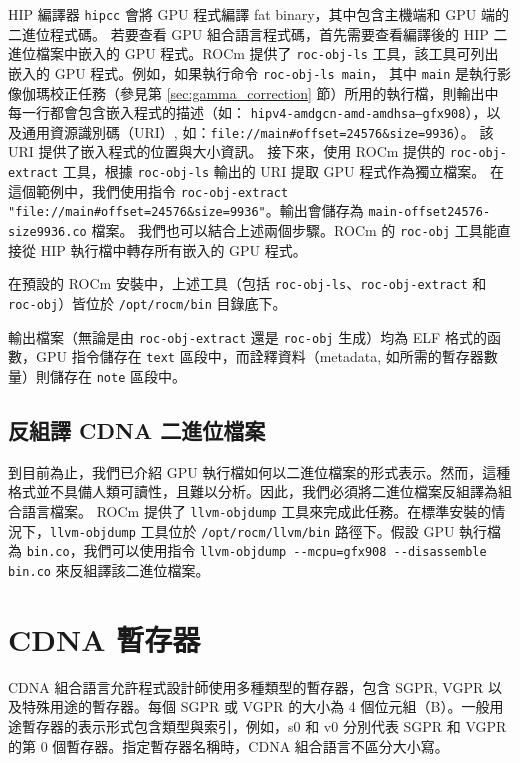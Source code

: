 HIP 編譯器 \lstinline|hipcc| 會將 GPU 程式編譯 fat binary，其中包含主機端和 GPU 端的二進位程式碼。
若要查看 GPU 組合語言程式碼，首先需要查看編譯後的 HIP 二進位檔案中嵌入的 GPU 程式。ROCm 提供了 \lstinline|roc-obj-ls| 工具，該工具可列出嵌入的 GPU 程式。例如，如果執行命令 \lstinline|roc-obj-ls main|，
其中 \lstinline|main| 是執行影像伽瑪校正任務（參見第 \ref{sec:gamma_correction} 節）所用的執行檔，則輸出中每一行都會包含嵌入程式的描述（如： \lstinline|hipv4-amdgcn-amd-amdhsa–gfx908|），以及通用資源識別碼（URI）, 如：\lstinline|file://main#offset=24576&size=9936|）。
該 URI 提供了嵌入程式的位置與大小資訊。
接下來，使用 ROCm 提供的 \lstinline|roc-obj-extract| 工具，根據 \lstinline|roc-obj-ls| 輸出的 URI 提取 GPU 程式作為獨立檔案。
在這個範例中，我們使用指令 \lstinline|roc-obj-extract "file://main#offset=24576&size=9936"|。輸出會儲存為 \lstinline|main-offset24576-size9936.co| 檔案。
我們也可以結合上述兩個步驟。ROCm 的 \lstinline|roc-obj| 工具能直接從 HIP 執行檔中轉存所有嵌入的 GPU 程式。

在預設的 ROCm 安裝中，上述工具（包括 \lstinline|roc-obj-ls|、\lstinline|roc-obj-extract| 和 \lstinline|roc-obj|）皆位於 \lstinline|/opt/rocm/bin| 目錄底下。

輸出檔案（無論是由 \lstinline|roc-obj-extract| 還是 \lstinline|roc-obj| 生成）均為 ELF 格式的函數，GPU 指令儲存在 \lstinline|text| 區段中，而詮釋資料（metadata, 如所需的暫存器數量）則儲存在 \lstinline|note| 區段中。


\subsection{反組譯 CDNA 二進位檔案}

到目前為止，我們已介紹 GPU 執行檔如何以二進位檔案的形式表示。然而，這種格式並不具備人類可讀性，且難以分析。因此，我們必須將二進位檔案反組譯為組合語言檔案。
ROCm 提供了 \lstinline|llvm-objdump| 工具來完成此任務。在標準安裝的情況下，\lstinline|llvm-objdump| 工具位於 \lstinline|/opt/rocm/llvm/bin| 路徑下。假設 GPU 執行檔為 \lstinline|bin.co|，我們可以使用指令 \lstinline|llvm-objdump --mcpu=gfx908 --disassemble bin.co| 來反組譯該二進位檔案。


\section{CDNA 暫存器}

CDNA 組合語言允許程式設計師使用多種類型的暫存器，包含 SGPR, VGPR 以及特殊用途的暫存器。每個 SGPR 或 VGPR 的大小為 4 個位元組（B）。一般用途暫存器的表示形式包含類型與索引，例如，s0 和 v0 分別代表 SGPR 和 VGPR 的第 0 個暫存器。指定暫存器名稱時，CDNA 組合語言不區分大小寫。

